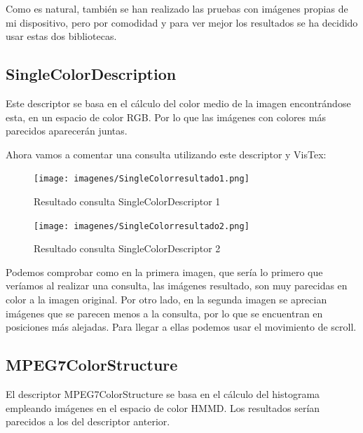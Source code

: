 Como es natural, también se han realizado las pruebas con imágenes propias de mi dispositivo, pero por comodidad y para ver mejor los resultados se ha decidido usar estas dos bibliotecas.


\subsection{SingleColorDescription}

Este descriptor se basa en el cálculo del color medio de la imagen encontrándose esta, en un espacio de color RGB. Por lo que las imágenes con colores más parecidos aparecerán juntas.

Ahora vamos a comentar una consulta utilizando este descriptor y VisTex:

\begin{figure}[H] %
\centering
\texttt{[image: imagenes/SingleColorresultado1.png]}  %
\label{SingleColorresultado1.png}
\caption{Resultado consulta SingleColorDescriptor 1 }
\end{figure}

\begin{figure}[H] %
\centering
\texttt{[image: imagenes/SingleColorresultado2.png]}  %
\label{SingleColorresultado2.png}
\caption{Resultado consulta SingleColorDescriptor 2 }
\end{figure}

Podemos comprobar como en la primera imagen, que sería lo primero que veríamos al realizar una consulta, las imágenes resultado, son muy parecidas en color a la imagen original. Por otro lado, en la segunda imagen se aprecian imágenes que se parecen menos a la consulta, por lo que se encuentran en posiciones más alejadas. Para llegar a ellas podemos usar el movimiento de scroll.


\subsection{MPEG7ColorStructure}

El descriptor MPEG7ColorStructure se basa en el cálculo del histograma empleando imágenes en el espacio de color HMMD. Los resultados serían parecidos a los del descriptor anterior.

